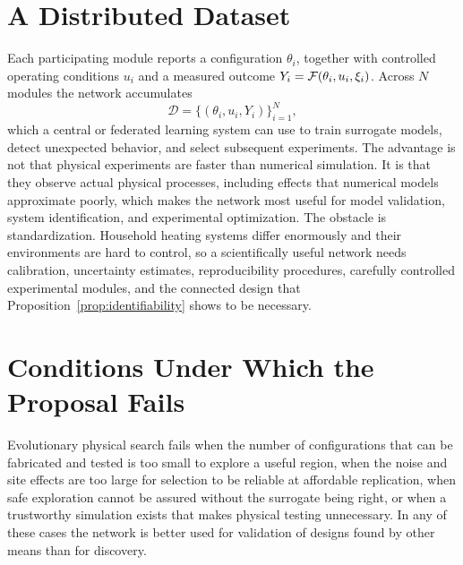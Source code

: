 \section{A Distributed Dataset}

Each participating module reports a configuration $\theta_i$, together with controlled operating conditions $u_i$ and a measured outcome $Y_i=\mathcal{F}(\theta_i,u_i,\xi_i)$. Across $N$ modules the network accumulates
\[
\mathcal D=\{(\theta_i,u_i,Y_i)\}_{i=1}^{N},
\]
which a central or federated learning system can use to train surrogate models, detect unexpected behavior, and select subsequent experiments. The advantage is not that physical experiments are faster than numerical simulation. It is that they observe actual physical processes, including effects that numerical models approximate poorly, which makes the network most useful for model validation, system identification, and experimental optimization. The obstacle is standardization. Household heating systems differ enormously and their environments are hard to control, so a scientifically useful network needs calibration, uncertainty estimates, reproducibility procedures, carefully controlled experimental modules, and the connected design that Proposition~\ref{prop:identifiability} shows to be necessary.

\section{Conditions Under Which the Proposal Fails}

Evolutionary physical search fails when the number of configurations that can be fabricated and tested is too small to explore a useful region, when the noise and site effects are too large for selection to be reliable at affordable replication, when safe exploration cannot be assured without the surrogate being right, or when a trustworthy simulation exists that makes physical testing unnecessary. In any of these cases the network is better used for validation of designs found by other means than for discovery.
